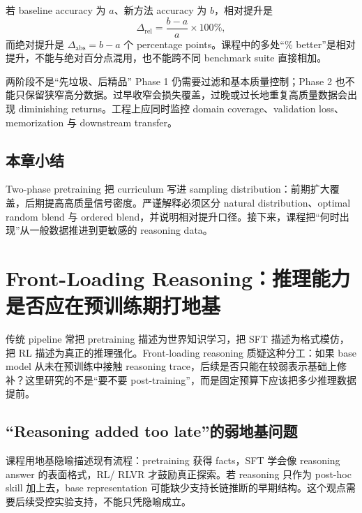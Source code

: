 \documentclass[a4paper]{article}
\begin{document}
若 baseline accuracy 为 $a$、新方法 accuracy 为 $b$，相对提升是
\[
\Delta_{\mathrm{rel}}=\frac{b-a}{a}\times 100\%,
\]
而绝对提升是 $\Delta_{\mathrm{abs}}=b-a$ 个 percentage points。课程中的多处“\% better”是相对提升，不能与绝对百分点混用，也不能跨不同 benchmark suite 直接相加。


\begin{warningbox}{两阶段不是“先垃圾、后精品”}
Phase 1 仍需要过滤和基本质量控制；Phase 2 也不能只保留狭窄高分数据。过早收窄会损失覆盖，过晚或过长地重复高质量数据会出现 diminishing returns。工程上应同时监控 domain coverage、validation loss、memorization 与 downstream transfer。
\end{warningbox}

\subsection{本章小结}

Two-phase pretraining 把 curriculum 写进 sampling distribution：前期扩大覆盖，后期提高高质量信号密度。严谨解释必须区分 natural distribution、optimal random blend 与 ordered blend，并说明相对提升口径。接下来，课程把“何时出现”从一般数据推进到更敏感的 reasoning data。

\section{Front-Loading Reasoning：推理能力是否应在预训练期打地基}

传统 pipeline 常把 pretraining 描述为世界知识学习，把 SFT 描述为格式模仿，把 RL 描述为真正的推理强化。Front-loading reasoning 质疑这种分工：如果 base model 从未在预训练中接触 reasoning trace，后续是否只能在较弱表示基础上修补？这里研究的不是“要不要 post-training”，而是固定预算下应该把多少推理数据提前。

\subsection{“Reasoning added too late”的弱地基问题}

课程用地基隐喻描述现有流程：pretraining 获得 facts，SFT 学会像 reasoning answer 的表面格式，RL/ RLVR 才鼓励真正探索。若 reasoning 只作为 post-hoc skill 加上去，base representation 可能缺少支持长链推断的早期结构。这个观点需要后续受控实验支持，不能只凭隐喻成立。
\end{document}
